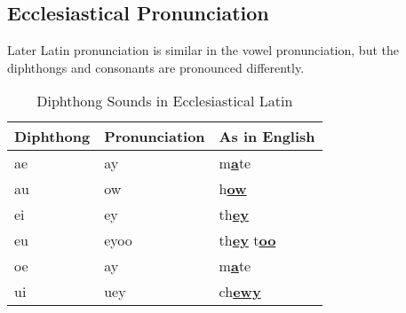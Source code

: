
\subsection{Ecclesiastical Pronunciation}
\label{sub_sec:ecclesiastical_pronunciation}

Later Latin pronunciation is similar in the vowel pronunciation, but the
diphthongs and consonants are pronounced differently.

\begin{table}[H]
	\centering

	\begin{tabular}{|l|l|l|}
		\hline
		\textbf{Diphthong} & \textbf{Pronunciation} & \textbf{As in English}                             \\
		\hline
		ae                 & ay                     & m\textbf{\underline{a}}te                          \\
		au                 & ow                     & h\textbf{\underline{ow}}                           \\
		ei                 & ey                     & th\textbf{\underline{ey}}                          \\
		eu                 & eyoo                   & th\textbf{\underline{ey}} t\textbf{\underline{oo}} \\
		oe                 & ay                     & m\textbf{\underline{a}}te                          \\
		ui                 & uey                    & ch\textbf{\underline{ewy}}                         \\
		\hline
	\end{tabular}

	\caption{Diphthong Sounds in Ecclesiastical Latin}
	\label{tab:diphthong_sounds_in_ecclesiastical_latin}
\end{table}




\newpage
